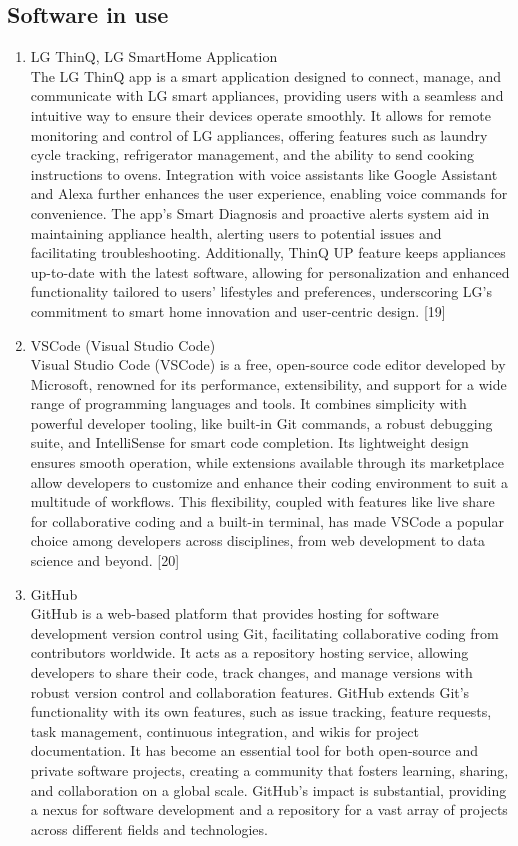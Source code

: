 \documentclass[conference]{IEEEtran}
\begin{document}
\subsection{\large{Software in use}}
\begin{enumerate}[label=\arabic*.]
\item LG ThinQ, LG SmartHome Application\\
The LG ThinQ app is a smart application designed to connect, manage, and communicate with LG smart appliances, providing users with a seamless and intuitive way to ensure their devices operate smoothly. It allows for remote monitoring and control of LG appliances, offering features such as laundry cycle tracking, refrigerator management, and the ability to send cooking instructions to ovens. Integration with voice assistants like Google Assistant and Alexa further enhances the user experience, enabling voice commands for convenience. The app's Smart Diagnosis and proactive alerts system aid in maintaining appliance health, alerting users to potential issues and facilitating troubleshooting. Additionally, ThinQ UP feature keeps appliances up-to-date with the latest software, allowing for personalization and enhanced functionality tailored to users' lifestyles and preferences, underscoring LG's commitment to smart home innovation and user-centric design. [19]\\
\item VSCode (Visual Studio Code)\\
Visual Studio Code (VSCode) is a free, open-source code editor developed by Microsoft, renowned for its performance, extensibility, and support for a wide range of programming languages and tools. It combines simplicity with powerful developer tooling, like built-in Git commands, a robust debugging suite, and IntelliSense for smart code completion. Its lightweight design ensures smooth operation, while extensions available through its marketplace allow developers to customize and enhance their coding environment to suit a multitude of workflows. This flexibility, coupled with features like live share for collaborative coding and a built-in terminal, has made VSCode a popular choice among developers across disciplines, from web development to data science and beyond. [20]\\
\item GitHub\\
GitHub is a web-based platform that provides hosting for software development version control using Git, facilitating collaborative coding from contributors worldwide. It acts as a repository hosting service, allowing developers to share their code, track changes, and manage versions with robust version control and collaboration features. GitHub extends Git's functionality with its own features, such as issue tracking, feature requests, task management, continuous integration, and wikis for project documentation. It has become an essential tool for both open-source and private software projects, creating a community that fosters learning, sharing, and collaboration on a global scale. GitHub's impact is substantial, providing a nexus for software development and a repository for a vast array of projects across different fields and technologies.\\

\end{enumerate}
\end{document}
